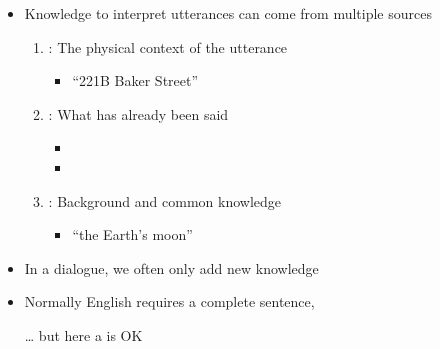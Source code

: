 \documentclass[a4paper,landscape,headrule,footrule,xetex]{foils}
\begin{document}
\begin{itemize}
\item Knowledge to interpret utterances can come from multiple sources
  \begin{enumerate}\addtolength{\itemsep}{1ex}
  \item {}: The physical context of the utterance
    \begin{itemize}
    \item {} ``221B Baker Street'' 
    \end{itemize}

  \item {}: What has already been said
    \begin{itemize}
    \item {}
    \item {} 
    \end{itemize}
  \item {}: Background and common knowledge
   \begin{itemize}
    \item {} ``the Earth's moon''
    \end{itemize}

  \end{enumerate}
\end{itemize}

\begin{itemize}
\item In a dialogue, we often only add new knowledge
  \begin{exe}
    \ex 
    \begin{xlist}
      \ex {}
      \ex {}
  \end{xlist}
    \ex 
    \begin{xlist}
      \ex {}
      \ex {}
  \end{xlist}
  \ex
  \begin{xlist}
   \ex {}
   \ex {} \hfill {}
 \end{xlist}
\end{exe}
\item Normally English requires a complete sentence, 
\item[\ldots] but here a  is OK
\end{itemize}
\end{document}
